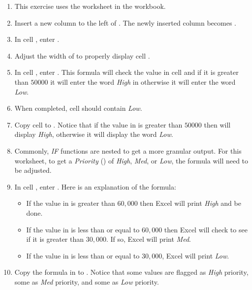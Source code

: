 \begin{enumbox}
	\begin{enumerate}
		\item This exercise uses the  worksheet in the  workbook.
		\item Insert a new column to the left of . The newly inserted column becomes .
		\item In cell , enter .
		\item Adjust the width of  to properly display cell .
		\item In cell , enter . This formula will check the value in cell  and if it is greater than $ 50000 $ it will enter the word \textit{High} in  otherwise it will enter the word \textit{Low}.
		\item When completed, cell  should contain \textit{Low}.
		\item Copy cell  to . Notice that if the value in  is greater than $ 50000 $ then  will display \textit{High}, otherwise it will display the word \textit{Low}.
		\item Commonly, \textit{IF} functions are nested to get a more granular output. For this worksheet, to get a \textit{Priority} () of \textit{High}, \textit{Med}, or \textit{Low}, the formula will need to be adjusted.
		\item In cell , enter . Here is an explanation of the formula:
		
		\begin{itemize}
			\item If the value in  is greater than $ 60,000 $ then Excel will print \textit{High} and be done.
			\item If the value in  is less than or equal to $ 60,000 $ then Excel will check to see if it is greater than $ 30,000 $. If so, Excel will print \textit{Med}.
			\item If the value in  is less than or equal to $ 30,000 $, Excel will print \textit{Low}.
		\end{itemize}
	
		\item Copy the formula in  to . Notice that some values are flagged as \textit{High} priority, some as \textit{Med} priority, and some as \textit{Low} priority.
		

\end{enumerate}
\end{enumbox}
